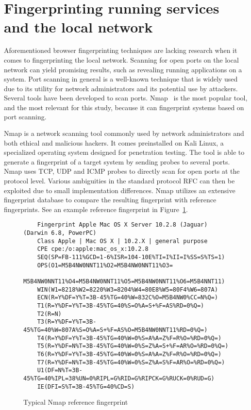 \section{Fingerprinting running services and the local network}
Aforementioned browser fingerprinting techniques are lacking research when it comes to fingerprinting the local network. Scanning for open ports on the local network can yield promising results, such as revealing running applications on a system.
Port scanning in general is a well-known technique that is widely used due to its utility for network administrators and its potential use by attackers.
Several tools have been developed to scan ports. Nmap~\cite{orebaugh201} is the most popular tool, and the most relevant for this study, because it can fingerprint systems based on port scanning. 

Nmap is a network scanning tool commonly used by network administrators and both ethical and malicious hackers. It comes preinstalled on Kali Linux, a specialized operating system designed for penetration testing. The tool is able to generate a fingerprint of a target system by sending probes to several ports. Nmap uses TCP, UDP and ICMP probes to directly scan for open ports at the protocol level. Various ambiguities in the standard protocol RFC can
then be exploited due to small implementation differences.
Nmap utilizes an extensive fingerprint database to compare the resulting fingerprint with reference fingerprints. See an example reference fingerprint in Figure~\ref{fig:nmap-fingerprint}. 

\begin{figure}[H]
    \begin{verbatim}
    Fingerprint Apple Mac OS X Server 10.2.8 (Jaguar) (Darwin 6.8, PowerPC)
    Class Apple | Mac OS X | 10.2.X | general purpose
    CPE cpe:/o:apple:mac_os_x:10.2.8
    SEQ(SP=FB-111%GCD=1-6%ISR=104-10E%TI=I%II=I%SS=S%TS=1)
    OPS(O1=M5B4NW0NNT11%O2=M5B4NW0NNT11%O3=
    M5B4NW0NNT11%O4=M5B4NW0NNT11%O5=M5B4NW0NNT11%O6=M5B4NNT11)
    WIN(W1=8218%W2=8220%W3=8204%W4=80E8%W5=80F4%W6=807A)
    ECN(R=Y%DF=Y%T=3B-45%TG=40%W=832C%O=M5B4NW0%CC=N%Q=)
    T1(R=Y%DF=Y%T=3B-45%TG=40%S=O%A=S+%F=AS%RD=0%Q=)
    T2(R=N)
    T3(R=Y%DF=Y%T=3B-45%TG=40%W=807A%S=O%A=S+%F=AS%O=M5B4NW0NNT11%RD=0%Q=)
    T4(R=Y%DF=Y%T=3B-45%TG=40%W=0%S=A%A=Z%F=R%O=%RD=0%Q=)
    T5(R=Y%DF=N%T=3B-45%TG=40%W=0%S=Z%A=S+%F=AR%O=%RD=0%Q=)
    T6(R=Y%DF=Y%T=3B-45%TG=40%W=0%S=A%A=Z%F=R%O=%RD=0%Q=)
    T7(R=Y%DF=N%T=3B-45%TG=40%W=0%S=Z%A=S%F=AR%O=%RD=0%Q=)
    U1(DF=N%T=3B-45%TG=40%IPL=38%UN=0%RIPL=G%RID=G%RIPCK=G%RUCK=0%RUD=G)
    IE(DFI=S%T=3B-45%TG=40%CD=S)
    \end{verbatim}
    \caption{Typical Nmap reference fingerprint~\cite{Lyon2009}}
    \label{fig:nmap-fingerprint}
\end{figure}

